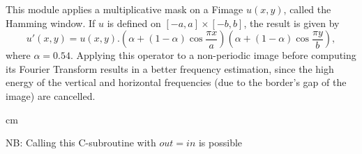This module applies a multiplicative mask on a Fimage $u(x,y)$, called 
the Hamming window. 
If $u$ is defined on $[-a,a] \times [-b,b]$, the result is given by
$$u'(x,y) = u(x,y) . \left( \alpha + (1-\alpha) \cos \frac{\pi x}{a} \right)
\left( \alpha + (1-\alpha) \cos \frac{\pi y}{b} \right),$$
where $\alpha = 0.54$.
Applying this operator to a non-periodic image before computing its Fourier
Transform results in a better frequency estimation, since the high energy
of the vertical and horizontal frequencies (due to the border's gap of 
the image) are cancelled.

 cm

NB: Calling this C-subroutine with $out=in$ is possible